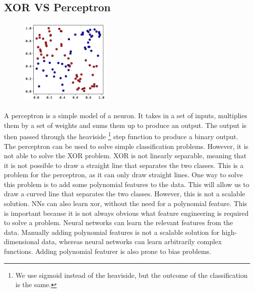 \documentclass[twoside,11pt]{report}
\begin{document}
\subsection*{XOR VS Perceptron}
\label{app:xor}

    \begin{figure}
        \begin{center}
            \includegraphics[width=0.4\textwidth]{../runsAndFigures/xor.png}
        \end{center}
        \caption{}\label{fig:xor_data}
    \end{figure}

    A perceptron is a simple model of a neuron. It takes in a set of inputs, multiplies them by a set of weights 
    and sums them up to produce an output. The output is then passed through the heaviside
    \footnote{We use sigmoid instead of the heaviside, but the outcome of the classification is the same.}
    step function to produce
    a binary output. The perceptron can be used to solve simple classification problems. However, it is not able to
    solve the XOR problem. XOR is not linearly separable, meaning that it is not possible to draw a straight line
    that separates the two classes. This is a problem for the perceptron, as it can only draw straight lines.
    One way to solve this problem is to add some polynomial features to the data. 
    This will allow us to draw a curved line that separates the two classes. However, this is not a scalable solution.
    NNs can also learn xor, without the need for a polynomial feature. This is important because it is not 
    always obvious what feature engineering is required to solve a problem. Neural networks can learn the 
    relevant 
    features from the data. Manually adding polynomial features is not a scalable solution for 
    high-dimensional data,
    whereas neural networks can learn arbitrarily complex functions. Adding polynomial featurer 
    is also prone to 
    bias problems.
\end{document}
